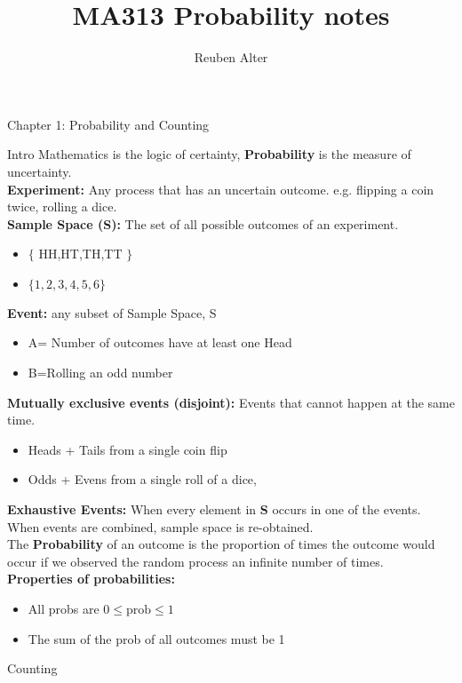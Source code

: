\documentclass[a4paper, 12pt]{article}
\title{MA313 Probability notes}
\author{Reuben Alter}
\date{}
\begin{document}
\maketitle
\newpage
\tableofcontents

\newpage

\begin{section}{Chapter 1: Probability and Counting}
\begin{subsection}{Intro}
Mathematics is the logic of certainty, 
\textbf{Probability} is the measure of uncertainty.\\
\textbf{Experiment:}
Any process that has an uncertain outcome. 
e.g. flipping a coin twice, rolling a dice.\\
\textbf{Sample Space (S):}
The set of all possible outcomes of an experiment.\\
\begin{itemize}
\item{$\lbrace$ HH,HT,TH,TT $\rbrace$}
\item{$\lbrace 1,2,3,4,5,6 \rbrace$}
\end{itemize}
\textbf{Event:} any subset of Sample Space, S
\begin{itemize}
\item{A= Number of outcomes have at least one Head}
\item{B=Rolling an odd number}
\end{itemize}
\textbf{Mutually exclusive events (disjoint):}
Events that cannot happen at the same time.
\begin{itemize}
\item{Heads + Tails from a single coin flip}
\item{Odds + Evens from a single roll of a dice,}
\end{itemize}
\textbf{Exhaustive Events:} 
When every element in \textbf{S} occurs in one of the events.
When events are combined, sample space is re-obtained. \\
The \textbf{Probability} of an outcome is the proportion of times the
outcome would occur if we observed the random process an infinite number
of times.\\
\textbf{Properties of probabilities:}
\begin{itemize}
\item{All probs are $0\leq\mbox{prob}\leq 1$}
\item{The sum of the prob of all outcomes must be 1}
\end{itemize}
\end{subsection}
\begin{subsection}{Counting}

\end{subsection}
\end{section}
\end{document}
